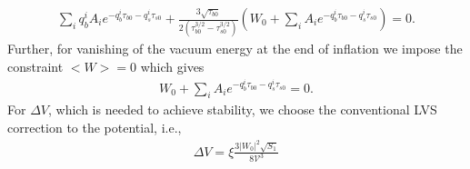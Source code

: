\documentclass[12pt]{article}
\begin{document}
\begin{align}
  \sum_i q^i_b A_i e^{-q_b^i \tau_{b0} - q^i_s \tau_{s0}} +
  \frac{3 \sqrt {\tau_{b0}}}{2 (\tau^{3/2}_{b0}- \tau^{3/2}_{s0})} \left( W_0 + \sum_i A_i e^{-q^i_b \tau_{b0} - q_s^i \tau_{s0}} \right) =0.
  \label{lvs-stabiltiy-1}
\end{align}
Further, for vanishing of the vacuum energy at the end of inflation we impose the constraint $<W>=0$ which gives
\begin{align}
  W_0 + \sum_i A_i e^{- q_b^i \tau_{b0} - q_s^i \tau_{s0}} =0.
\end{align}
For $\Delta V$, which is needed to achieve stability,
we choose the conventional LVS correction to the potential, i.e.,
\begin{align}
  \Delta V= \xi \frac{3 |W_0|^2 \sqrt {S_1}}{8 \mathcal{V}^3}
\end{align}
\end{document}
